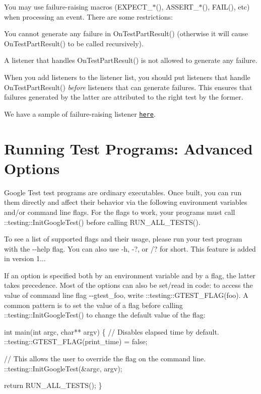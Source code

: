 You may use failure-\/raising macros ({\ttfamily E\+X\+P\+E\+C\+T\+\_\+$\ast$()}, {\ttfamily A\+S\+S\+E\+R\+T\+\_\+$\ast$()}, {\ttfamily F\+A\+I\+L()}, etc) when processing an event. There are some restrictions\+:


\begin{DoxyEnumerate}
\item You cannot generate any failure in {\ttfamily On\+Test\+Part\+Result()} (otherwise it will cause {\ttfamily On\+Test\+Part\+Result()} to be called recursively).
\end{DoxyEnumerate}
\begin{DoxyEnumerate}
\item A listener that handles {\ttfamily On\+Test\+Part\+Result()} is not allowed to generate any failure.
\end{DoxyEnumerate}

When you add listeners to the listener list, you should put listeners that handle {\ttfamily On\+Test\+Part\+Result()} {\itshape before} listeners that can generate failures. This ensures that failures generated by the latter are attributed to the right test by the former.

We have a sample of failure-\/raising listener \href{../samples/sample10_unittest.cc}{\tt here}.

\section*{Running Test Programs\+: Advanced Options}

Google Test test programs are ordinary executables. Once built, you can run them directly and affect their behavior via the following environment variables and/or command line flags. For the flags to work, your programs must call {\ttfamily \+::testing\+::\+Init\+Google\+Test()} before calling {\ttfamily R\+U\+N\+\_\+\+A\+L\+L\+\_\+\+T\+E\+S\+T\+S()}.

To see a list of supported flags and their usage, please run your test program with the {\ttfamily -\/-\/help} flag. You can also use {\ttfamily -\/h}, {\ttfamily -\/?}, or {\ttfamily /?} for short. This feature is added in version 1...

If an option is specified both by an environment variable and by a flag, the latter takes precedence. Most of the options can also be set/read in code\+: to access the value of command line flag {\ttfamily -\/-\/gtest\+\_\+foo}, write {\ttfamily \+::testing\+::\+G\+T\+E\+S\+T\+\_\+\+F\+L\+A\+G(foo)}. A common pattern is to set the value of a flag before calling {\ttfamily \+::testing\+::\+Init\+Google\+Test()} to change the default value of the flag\+: 
\begin{DoxyCode}
int main(int argc, char** argv) \{
  // Disables elapsed time by default.
  ::testing::GTEST\_FLAG(print\_time) = false;

  // This allows the user to override the flag on the command line.
  ::testing::InitGoogleTest(&argc, argv);

  return RUN\_ALL\_TESTS();
\}
\end{DoxyCode}


